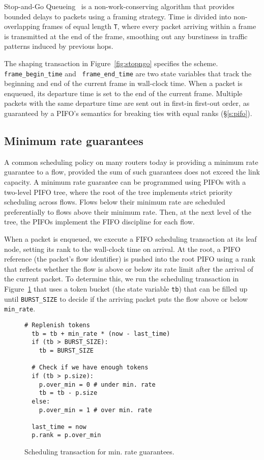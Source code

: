 Stop-and-Go Queueing~\cite{stopngo} is a non-work-conserving algorithm
that provides bounded delays to packets using a framing strategy. Time
is divided into non-overlapping frames of equal length \texttt{T}, where
every packet arriving within a frame is transmitted at the end of the
frame, smoothing out any burstiness in traffic patterns induced by
previous hops.

The shaping transaction in Figure~\ref{fig:stopngo}
specifies the scheme. {\tt frame\_begin\_time} and {\tt
  frame\_end\_time} are two state variables that track the beginning
and end of the current frame in wall-clock time.  When a packet is
enqueued, its departure time is set to the end of the current frame.
Multiple packets with the same departure time are sent out in first-in
first-out order, as guaranteed by a PIFO's semantics for breaking ties
with equal ranks (\S\ref{s:pifo}).

\subsection{Minimum rate guarantees}
\label{ss:min_rate}

A common scheduling policy on many routers today is providing a
minimum rate guarantee to a flow, provided the sum of such guarantees
does not exceed the link capacity. A minimum rate guarantee can be
programmed using PIFOs with a two-level PIFO tree, where the root of
the tree implements strict priority scheduling across flows. Flows
below their minimum rate are scheduled preferentially to flows above
their minimum rate. Then, at the next level of the tree, the PIFOs
implement the FIFO discipline for each flow.

When a packet is enqueued, we execute a FIFO scheduling transaction at
its leaf node, setting its rank to the wall-clock time on arrival. At
the root, a PIFO reference (the packet's flow identifier) is pushed
into the root PIFO using a rank that reflects whether the flow is
above or below its rate limit after the arrival of the current
packet. To determine this, we run the scheduling transaction in
Figure~\ref{fig:min_rate} that uses a token bucket (the state variable
{\tt tb}) that can be filled up until {\tt BURST\_SIZE} to decide if
the arriving packet puts the flow above or below {\tt min\_rate}.

\begin{figure}
  \begin{lstlisting}[style=customc]
  # Replenish tokens
  tb = tb + min_rate * (now - last_time)
  if (tb > BURST_SIZE):
    tb = BURST_SIZE

  # Check if we have enough tokens
  if (tb > p.size):
    p.over_min = 0 # under min. rate
    tb = tb - p.size
  else:
    p.over_min = 1 # over min. rate

  last_time = now
  p.rank = p.over_min
  \end{lstlisting}
\caption{Scheduling transaction for min. rate guarantees.}
\label{fig:min_rate}
\end{figure}

